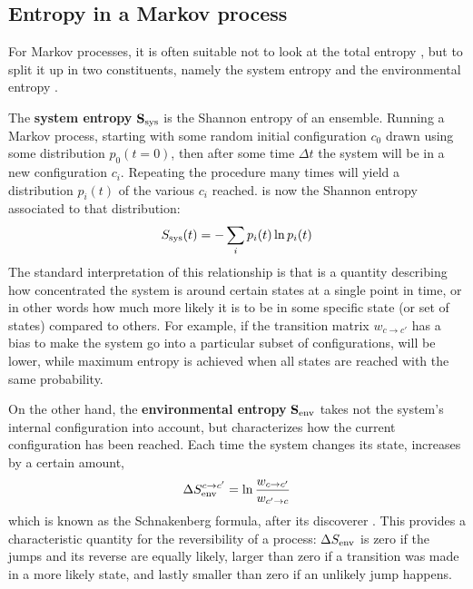 \subsection{Entropy in a Markov process}

For Markov processes, it is often suitable not to look at the total entropy \STot{}, but to split it up in two constituents, namely the system entropy \SSys{} and the environmental entropy \SEnv{}.

The \textbf{system entropy} \(\mathbf{S_\text{sys}{}}\) is the Shannon entropy of an ensemble. Running a Markov process, starting with some random initial configuration \(c_0\) drawn using some distribution \(p_0(t=0)\), then after some time \(\Delta t\) the system will be in a new configuration \(c_i\). Repeating the procedure many times will yield a distribution \(p_i(t)\) of the various \(c_i\) reached. \SSys{} is now the Shannon entropy associated to that distribution:
%
\begin{align}
	S_\text{sys}(t) = -\sum_i p_i(t)\ln p_i(t)
\end{align}
%
The standard interpretation of this relationship is that \SSys{} is a quantity describing how concentrated the system is around certain states at a single point in time, or in other words how much more likely it is to be in some specific state (or set of states) compared to others. For example, if the transition matrix \(w_{c\to c'}\) has a bias to make the system go into a particular subset of configurations, \SSys will be lower, while maximum entropy is achieved when all states are reached with the same probability.

On the other hand, the \textbf{environmental entropy} \(\mathbf{S_\text{env}{}}\) takes not the system's internal configuration into account, but characterizes how the current configuration has been reached. Each time the system changes its state, \SEnv{} increases by a certain amount,
%
\begin{align}
	\label{eqn:SEnv single jump definition}
	\Delta S_\text{env}^{c\to c'} = \ln\frac{w_{c\to c'}}{w_{c'\to c}}
\end{align}
which is known as the Schnakenberg formula, after its discoverer \cite{schnakenberg}.
%
This provides a characteristic quantity for the reversibility of a process: \(\Delta S_\text{env}\) is zero if the jumps and its reverse are equally likely, larger than zero if a transition was made in a more likely state, and lastly smaller than zero if an unlikely jump happens.

